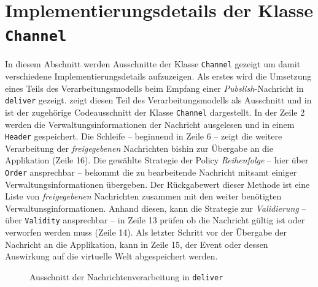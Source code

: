 

\section{Implementierungsdetails der Klasse \texttt{Channel}}
In diesem Abschnitt werden Ausschnitte der Klasse \texttt{Channel} gezeigt um damit verschiedene Implementierungsdetails aufzuzeigen. Als erstes wird die Umsetzung eines Teils des Verarbeitungsmodells beim Empfang einer \emph{Pubslish}-Nachricht in \texttt{deliver} gezeigt.  zeigt diesen Teil des Verarbeitungsmodells als Ausschnitt und in  ist der zugehörige Codeausschnitt der Klasse \texttt{Channel} dargestellt. In der Zeile 2 werden die Verwaltungsinformationen der Nachricht ausgelesen und in einem \texttt{Header} gespeichert.  Die Schleife -- beginnend in Zeile 6 -- zeigt die weitere Verarbeitung der \emph{freigegebenen} Nachrichten bishin zur Übergabe an die Applikation (Zeile 16). Die gewählte Strategie der Policy \emph{Reihenfolge} -- hier über \texttt{Order} ansprechbar -- bekommt die zu bearbeitende Nachricht mitsamt einiger Verwaltungsinformationen übergeben. Der Rückgabewert dieser Methode ist eine Liste von \emph{freigegebenen} Nachrichten zusammen mit den weiter benötigten Verwaltunsginformationen. Anhand diesen, kann die Strategie zur \emph{Validierung} -- über \texttt{Validity} ansprechbar -- in Zeile 13 prüfen ob die Nachricht gültig ist oder verworfen werden muss (Zeile 14). Als letzter Schritt vor der Übergabe der Nachricht an die Applikation, kann in Zeile 15, der Event oder dessen Auswirkung auf die virtuelle Welt abgespeichert werden.



\begin{figure}[htbp]
\centering
{}
\caption{Ausschnitt der Nachrichtenverarbeitung in \texttt{deliver}}
\label{fig:processing_deliver_ovpd}
\end{figure}

